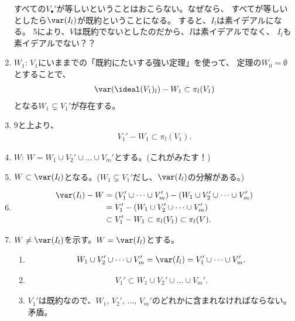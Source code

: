 \begin{enumerate}
  すべての$V_\bullet'$が等しいということはおこらない。なぜなら、
  すべてが等しいとしたら$\var(I_l)$が既約ということになる。
  すると、$I_l$は素イデアルになる。
  5により、$V$は既約でないとしたのだから、$I$は素イデアルでなく、
  $I_l$も素イデアルでない？？
  \item $W_1$: $V_1$にいままでの「既約にたいする強い定理」を使って、
  定理の$W_0=\emptyset$とすることで、
  \begin{align}
    \var(\ideal(V_1)_l)- W_1 \subset \pi_l(V_1)
  \end{align}
  となる$W_1 \subsetneq V_1'$が存在する。
  \item
  9と上より、
  \begin{align}
    V_1' - W_1 \subset \pi_l(V_1).
  \end{align}
  \item
  $W$: $W=W_1 \cup V_2' \cup \dots \cup V_m'$とする。(これがみたす！)
  \item
  $W\subset \var(I_l)$となる。($W_1\subsetneq V_1'$だし、$\var(I_l)$の分解がある。)
  \item
  \begin{align}
    \var(I_l) - W
    &=
    (V_1' \cup \dots \cup V_m')  - (W_1 \cup V_2' \cup \dots \cup V_m')\\
    &=
    V_1' -  (W_1 \cup V_2' \cup \dots \cup V_m')\\
    &\subset
    V_1'-W_1 \subset \pi_l(V_1) \subset \pi_l(V).
  \end{align}
  \item
  $W\neq \var(I_l)$を示す。$W=\var(I_l)$とする。
  \begin{enumerate}
    \item
    \begin{align}
      W_1 \cup V_2' \cup \dots \cup V_m' = \var(I_l) = V_1' \cup \dots \cup V_m'.
    \end{align}
    \item
    \begin{align}
      V_1' \subset W_1 \cup V_2' \cup \dots \cup V_m'.
    \end{align}
    \item
    $V_1'$は既約なので、$W_1,\, V_2',\, \dots ,\, V_m'$のどれかに含まれなければならない。矛盾。
  \end{enumerate}

\end{enumerate}
